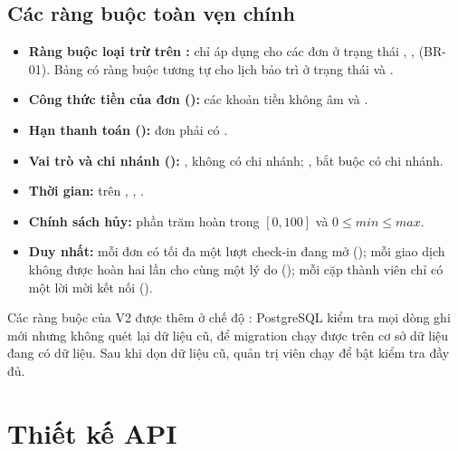 \subsection{Các ràng buộc toàn vẹn chính}
\begin{itemize}
    \item \textbf{Ràng buộc loại trừ trên :}  chỉ áp dụng cho các đơn ở trạng thái , ,  (BR-01). Bảng  có ràng buộc tương tự cho lịch bảo trì ở trạng thái  và .
    \item \textbf{Công thức tiền của đơn ():} các khoản tiền không âm và .
    \item \textbf{Hạn thanh toán ():} đơn  phải có .
    \item \textbf{Vai trò và chi nhánh ():} ,  không có chi nhánh; ,  bắt buộc có chi nhánh.
    \item \textbf{Thời gian:}  trên , , .
    \item \textbf{Chính sách hủy:} phần trăm hoàn trong $[0, 100]$ và $0 \le min \le max$.
    \item \textbf{Duy nhất:} mỗi đơn có tối đa một lượt check-in đang mở (); mỗi giao dịch không được hoàn hai lần cho cùng một lý do (); mỗi cặp thành viên chỉ có một lời mời kết nối ().
\end{itemize}
Các ràng buộc  của V2 được thêm ở chế độ : PostgreSQL kiểm tra mọi dòng ghi mới nhưng không quét lại dữ liệu cũ, để migration chạy được trên cơ sở dữ liệu đang có dữ liệu. Sau khi dọn dữ liệu cũ, quản trị viên chạy  để bật kiểm tra đầy đủ.

\section{Thiết kế API}
\label{sec:thietke_api}


